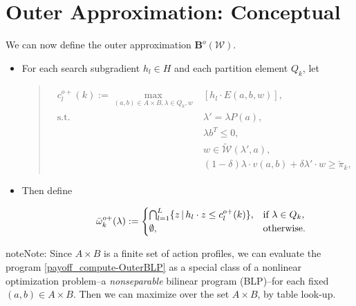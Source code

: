 \documentclass[a4paper,10pt,english]{sphinxmanual}
\begin{document}
\section{Outer Approximation: Conceptual}
\label{payoff_compute:outer-concept}\label{payoff_compute:outer-approximation-conceptual}
We can now define the outer approximation \(\mathbf{B}^o(\mathcal{W})\).
\begin{itemize}
\item {} 
For each search subgradient \(h_l\in H\) and each partition element \(Q_k\), let
\begin{quote}
\label{payoff_compute:equation-OuterBLP}\begin{gather}
\begin{split}c^{o+}_l(k):=\max_{(a,b) \in A \times B,\lambda\in Q_k, w}& [h_l \cdot E(a,b,w)],
\\
\text{s.t.}\,\,&\lambda'=\lambda P(a),
\\
& \lambda b^T \leq 0,
\\
& w\in \tilde{\mathcal{W}}(\lambda', a),
\\
& (1-\delta)\lambda \cdot v(a,b)+\delta \lambda' \cdot w\geq \check{\pi}_k,\end{split}\label{payoff_compute-OuterBLP}
\end{gather}\end{quote}

\item {} \begin{description}
\item[{Then define}] \leavevmode\begin{gather}
\begin{split}\bar{\omega}^{o+}_k (\lambda) :=
\begin{cases}
\bigcap_{l=1}^L \{z\,|\, h_l\cdot z\leq  c^{o+}_l(k)\},& \text{if} \ \lambda \in Q_k,\\
\emptyset, & \text{otherwise}.
\end{cases}\end{split}\notag
\end{gather}
\end{description}

\end{itemize}

\begin{notice}{note}{Note:}
Since \(A \times B\) is a finite set of action profiles, we can evaluate the program \eqref{payoff_compute-OuterBLP} as a special class of a nonlinear optimization problem--a \emph{nonseparable} bilinear program (BLP)--for each fixed \((a,b) \in A \times B\). Then we can maximize over the set \(A \times B\), by table look-up.
\end{notice}
\end{document}
